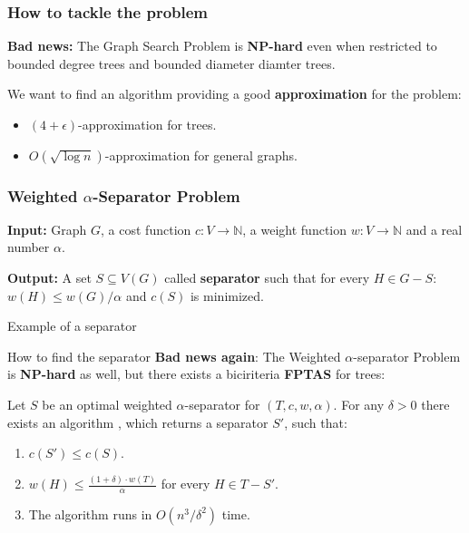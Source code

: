 \documentclass{beamer}
\newcommand{\br}[1]{\mathopen{}\left( #1 \right)}
\begin{document}
\begin{frame}
\frametitle{How to tackle the problem}
\textbf{Bad news:}
The Graph Search Problem is \textbf{NP-hard} even when restricted to bounded degree trees and bounded diameter diamter trees. 
\pause

We want to find an algorithm providing a good \textbf{approximation} for the problem:
\begin{itemize}
    \item $\br{4+\epsilon}$-approximation for trees.
    \item $O\br{\sqrt{\log n}}$-approximation for general graphs.
\end{itemize}
\end{frame}

\begin{frame}
\frametitle{Weighted $\alpha$-Separator Problem}
\begin{tcolorbox}[colback=white, title=Weighted $\alpha$-Separator Problem, fonttitle=\bfseries, breakable]
\textbf{Input:} Graph $G$, a cost function $c:V\to \mathbb{N}$, a weight function $w:V\to \mathbb{N}$ and a real number $\alpha$.

\pause
\textbf{Output:} A set $S\subseteq V\br{G}$ called \textbf{separator} such that for every $H\in G-S$: $w\br{H}\leq w\br{G}/\alpha$ and $c\br{S}$ is minimized.
\end{tcolorbox}

\end{frame}

\begin{frame}{Example of a separator}
    
\end{frame}

\begin{frame}{How to find the separator}
\textbf{Bad news again}: The Weighted $\alpha$-separator Problem is \textbf{NP-hard} as well, but there exists a biciriteria \textbf{FPTAS} for trees:
\pause
\begin{theorem}
    Let $S$ be an optimal weighted $\alpha$-separator for $\br{T,c,w,\alpha}$. For any $\delta>0$ there exists an algorithm \FSeparatorFPTAS, which returns a separator $S'$, such that:
    \begin{enumerate}
        \item $c\br{S'}\leq c\br{S}$.
        \item $w\br{H}\leq \frac{\br{1+\delta}\cdot w\br{T}}{\alpha}$ for every $H\in T-S'$.
        \item The algorithm runs in $O\br{n^3/\delta^2}$ time.
    \end{enumerate}
\end{theorem}

\end{frame}
\end{document}
